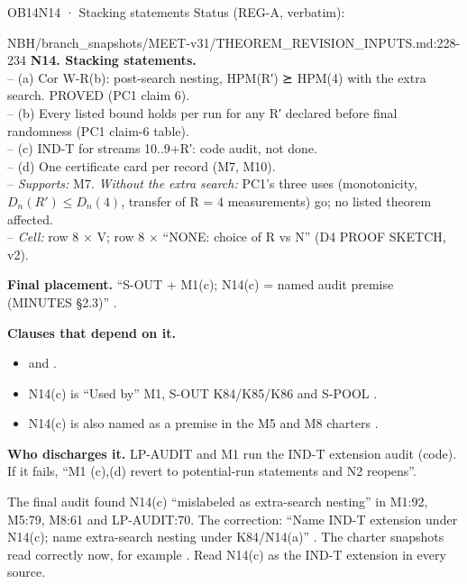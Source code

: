\begin{card}{OB14}{N14 · Stacking statements}
Status (REG-A, verbatim):  
\begin{stmt}{NBH/branch_snapshots/MEET-v31/THEOREM_REVISION_INPUTS.md:228-234}
\textbf{N14. Stacking statements.}\\
– (a) Cor W-R(b): post-search nesting, HPM(R′) ⪰ HPM(4) with the extra search. PROVED (PC1 claim 6).\\
– (b) Every listed bound holds per run for any R′ declared before final randomness (PC1 claim-6 table).\\
– (c) IND-T for streams 10..9+R′: code audit, not done.\\
– (d) One certificate card per record (M7, M10).\\
– \emph{Supports:} M7. \emph{Without the extra search:} PC1's three uses (monotonicity, $D_n(R′) ≤ D_n(4)$, transfer of R = 4 measurements) go; no listed theorem affected.\\
– \emph{Cell:} row 8 × V; row 8 × ``NONE: choice of R vs N'' (D4 PROOF SKETCH, v2).
\end{stmt}
\textbf{Final placement.} ``S-OUT + M1(c); N14(c) = named audit premise (MINUTES §2.3)'' .

\textbf{Clauses that depend on it.}
\begin{itemize}
\item {} and .
\item N14(c) is ``Used by'' M1, S-OUT K84/K85/K86 and S-POOL  .
\item N14(c) is also named as a premise in the M5  and M8  charters  .
\end{itemize}

\textbf{Who discharges it.} LP-AUDIT and M1 run the IND-T extension audit (code). If it fails, ``M1 (c),(d) revert to potential-run statements and N2 reopens''.
\begin{uncertain}
The final audit found N14(c) ``mislabeled as extra-search nesting'' in M1:92, M5:79, M8:61 and LP-AUDIT:70. The correction: ``Name IND-T extension under N14(c); name extra-search nesting under K84/N14(a)'' . The charter snapshots read correctly now, for example . Read N14(c) as the IND-T extension in every source.
\end{uncertain}
\end{card}

